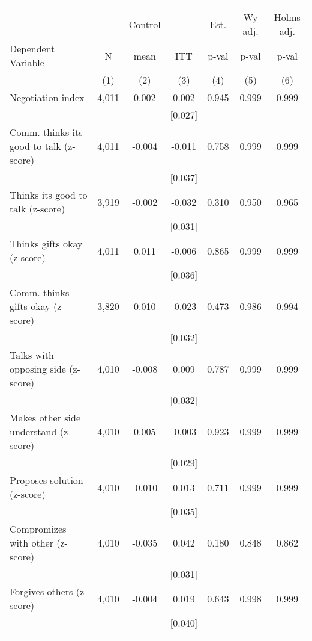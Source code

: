 \begin{tabular}{lcccccc}
\hline \noalign{\smallskip} &  &  &  &  &  & \\
 &  & Control &  & Est. & Wy adj. & Holms adj.\\
Dependent Variable & N & mean & ITT & p-val & p-val & p-val\\
 & (1) & (2) & (3) & (4) & (5) & (6)\\
\noalign{\smallskip}\hline \noalign{\smallskip}\quad Negotiation index & 4,011 & 0.002 & 0.002 & 0.945 & 0.999 & 0.999\\
 &  &  & [0.027] &  &  & \\
\quad Comm. thinks its good to talk (z-score) & 4,011 & -0.004 & -0.011 & 0.758 & 0.999 & 0.999\\
 &  &  & [0.037] &  &  & \\
\quad Thinks its good to talk (z-score) & 3,919 & -0.002 & -0.032 & 0.310 & 0.950 & 0.965\\
 &  &  & [0.031] &  &  & \\
\quad Thinks gifts okay (z-score) & 4,011 & 0.011 & -0.006 & 0.865 & 0.999 & 0.999\\
 &  &  & [0.036] &  &  & \\
\quad Comm. thinks gifts okay (z-score) & 3,820 & 0.010 & -0.023 & 0.473 & 0.986 & 0.994\\
 &  &  & [0.032] &  &  & \\
\quad Talks with opposing side (z-score) & 4,010 & -0.008 & 0.009 & 0.787 & 0.999 & 0.999\\
 &  &  & [0.032] &  &  & \\
\quad Makes other side understand (z-score) & 4,010 & 0.005 & -0.003 & 0.923 & 0.999 & 0.999\\
 &  &  & [0.029] &  &  & \\
\quad Proposes solution (z-score) & 4,010 & -0.010 & 0.013 & 0.711 & 0.999 & 0.999\\
 &  &  & [0.035] &  &  & \\
\quad Compromizes with other (z-score) & 4,010 & -0.035 & 0.042 & 0.180 & 0.848 & 0.862\\
 &  &  & [0.031] &  &  & \\
\quad Forgives others (z-score) & 4,010 & -0.004 & 0.019 & 0.643 & 0.998 & 0.999\\
 &  &  & [0.040] &  &  & \\
\noalign{\smallskip}\hline\end{tabular}
